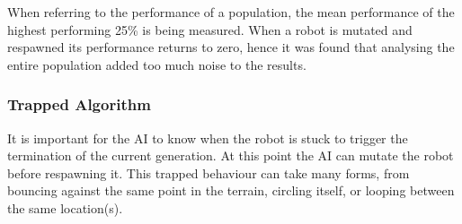 \documentclass{article}
\begin{document}
When referring to the performance of a population, the mean performance of the highest performing 25\% is being measured. When a robot is mutated and respawned its performance returns to zero, hence it was found that analysing the entire population added too much noise to the results. 

\subsubsection{Trapped Algorithm}
It is important for the AI to know when the robot is stuck to trigger the termination of the current generation. At this point the AI can mutate the robot before respawning it. This trapped behaviour can take many forms, from bouncing against the same point in the terrain, circling itself, or looping between the same location(s).\\
\end{document}

